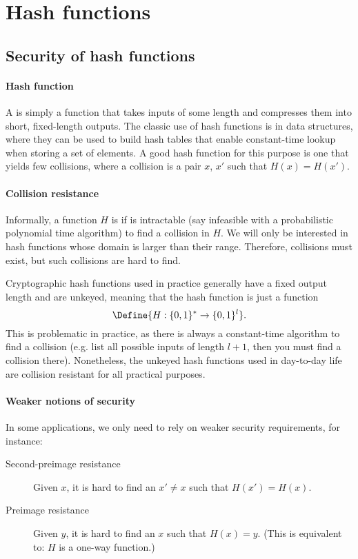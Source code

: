 \documentclass[a4paper, 11pt, openany]{book}
\begin{document}
\section{Hash functions}
\label{sec:17}

\subsection{Security of hash functions}


\paragraph{Hash function}

A  is simply a function that takes inputs of some length and compresses them into short, fixed-length outputs. The classic use of hash functions is in data structures, where they can be used to build hash tables that enable constant-time lookup when storing a set of elements. A good hash function for this purpose is one that yields few collisions, where a collision is a pair $x$, $x'$ such that $H(x) = H(x')$.

\paragraph{Collision resistance}

Informally, a function $H$ is  if is intractable (say infeasible with a probabilistic polynomial time algorithm) to find a collision in $H$. We will only be interested in hash functions whose domain is larger than their range. Therefore, collisions must exist, but such collisions are hard to find.

Cryptographic hash functions used in practice generally have a fixed output length and are unkeyed, meaning that the hash function is just a function
\[
    \Define{H : \{0,1\}^* \to \{0,1\}^l}.
\]
This is problematic in practice, as there is always a constant-time algorithm to find a collision (e.g. list all possible inputs of length $l+1$, then you must find a collision there). Nonetheless, the unkeyed hash functions used in day-to-day life are collision resistant for all practical purposes.

\paragraph{Weaker notions of security}

In some applications, we only need to rely on weaker security requirements, for instance:
\begin{description}
    \item [Second-preimage resistance] Given $x$, it is hard to find an $x' \ne x$ such that $H(x') = H(x)$.

    \item [Preimage resistance] Given $y$, it is hard to find an $x$ such that $H(x) = y$. (This is equivalent to: $H$ is a one-way function.)
\end{description}
\end{document}

